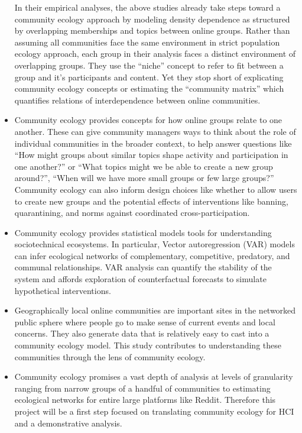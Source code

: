 \documentclass[12pt]{memoir}
\begin{document}
\begin{itemize}
In their empirical analyses, the above studies already take steps toward a community ecology approach by modeling density dependence as structured by overlapping memberships and topics between online groups.  Rather than assuming all communities face the same environment in strict population ecology approach, each group in their analysis faces a distinct environment of overlapping groups. They use the ``niche'' concept to refer to fit between a group and it's participants and content. Yet they stop short of explicating community ecology concepts or estimating the ``community matrix'' which quantifies relations of interdependence between online communities. 

\item Community ecology provides concepts for how online groups relate to one another.  These can give community managers ways to think about the role of individual communities in the broader context, to help answer questions like ``How might groups about similar topics shape activity and participation in one another?'' or ``What topics might we be able to create a new group around?'', ``When will we have more small groups or few large groups?'' Community ecology can also inform design choices like whether to allow users to create new groups and the potential effects of interventions like banning, quarantining, and norms against coordinated cross-participation.

\item Community ecology provides statistical models tools for understanding sociotechnical ecosystems.  In particular, Vector autoregression (VAR) models can infer ecological networks of complementary, competitive, predatory, and communal relationships.  VAR analysis can quantify the stability of the system and affords exploration of counterfactual forecasts to simulate hypothetical interventions. 

\item Geographically local online communities are important sites in the networked public sphere where people go to make sense of current events and local concerns.  They also generate data that is relatively easy to cast into a community ecology model.  This study contributes to understanding these communities through the lens of community ecology. 

\item Community ecology promises a vast depth of analysis at levels of granularity ranging from narrow groups of a handful of communities to estimating ecological networks for entire large platforms like Reddit.  Therefore this project will be a first step focused on translating community ecology for HCI and a demonstrative analysis.  

\end{itemize}
\end{document}
